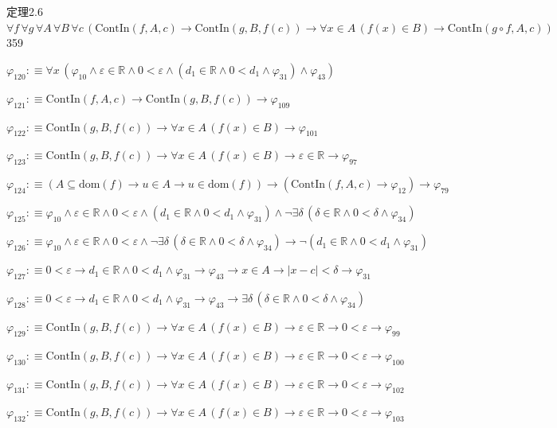 \begin{fullproof}{定理2.6}{$\forall f\,\forall g\,\forall A\,\forall B\,\forall c\,(\mathrm{ContIn}(f,A,c) \to \mathrm{ContIn}(g,B,f(c)) \to \forall x \in A\,(f(x) \in B) \to \mathrm{ContIn}(g \circ f,A,c))$}{359}
\begin{abbrevlist}
\item $\varphi_{120} :\equiv \forall x\,(\varphi_{10} \land \varepsilon \in \mathbb{R} \land 0 < \varepsilon \land (d_{1} \in \mathbb{R} \land 0 < d_{1} \land \varphi_{31}) \land \varphi_{43})$
\item $\varphi_{121} :\equiv \mathrm{ContIn}(f,A,c) \to \mathrm{ContIn}(g,B,f(c)) \to \varphi_{109}$
\item $\varphi_{122} :\equiv \mathrm{ContIn}(g,B,f(c)) \to \forall x \in A\,(f(x) \in B) \to \varphi_{101}$
\item $\varphi_{123} :\equiv \mathrm{ContIn}(g,B,f(c)) \to \forall x \in A\,(f(x) \in B) \to \varepsilon \in \mathbb{R} \to \varphi_{97}$
\item $\varphi_{124} :\equiv (A \subseteq \mathrm{dom}(f) \to u \in A \to u \in \mathrm{dom}(f)) \to (\mathrm{ContIn}(f,A,c) \to \varphi_{12}) \to \varphi_{79}$
\item $\varphi_{125} :\equiv \varphi_{10} \land \varepsilon \in \mathbb{R} \land 0 < \varepsilon \land (d_{1} \in \mathbb{R} \land 0 < d_{1} \land \varphi_{31}) \land \neg \exists \delta\,(\delta \in \mathbb{R} \land 0 < \delta \land \varphi_{34})$
\item $\varphi_{126} :\equiv \varphi_{10} \land \varepsilon \in \mathbb{R} \land 0 < \varepsilon \land \neg \exists \delta\,(\delta \in \mathbb{R} \land 0 < \delta \land \varphi_{34}) \to \neg (d_{1} \in \mathbb{R} \land 0 < d_{1} \land \varphi_{31})$
\item $\varphi_{127} :\equiv 0 < \varepsilon \to d_{1} \in \mathbb{R} \land 0 < d_{1} \land \varphi_{31} \to \varphi_{43} \to x \in A \to \lvert x - c \rvert < \delta \to \varphi_{31}$
\item $\varphi_{128} :\equiv 0 < \varepsilon \to d_{1} \in \mathbb{R} \land 0 < d_{1} \land \varphi_{31} \to \varphi_{43} \to \exists \delta\,(\delta \in \mathbb{R} \land 0 < \delta \land \varphi_{34})$
\item $\varphi_{129} :\equiv \mathrm{ContIn}(g,B,f(c)) \to \forall x \in A\,(f(x) \in B) \to \varepsilon \in \mathbb{R} \to 0 < \varepsilon \to \varphi_{99}$
\item $\varphi_{130} :\equiv \mathrm{ContIn}(g,B,f(c)) \to \forall x \in A\,(f(x) \in B) \to \varepsilon \in \mathbb{R} \to 0 < \varepsilon \to \varphi_{100}$
\item $\varphi_{131} :\equiv \mathrm{ContIn}(g,B,f(c)) \to \forall x \in A\,(f(x) \in B) \to \varepsilon \in \mathbb{R} \to 0 < \varepsilon \to \varphi_{102}$
\item $\varphi_{132} :\equiv \mathrm{ContIn}(g,B,f(c)) \to \forall x \in A\,(f(x) \in B) \to \varepsilon \in \mathbb{R} \to 0 < \varepsilon \to \varphi_{103}$

\end{abbrevlist}
\end{fullproof}

